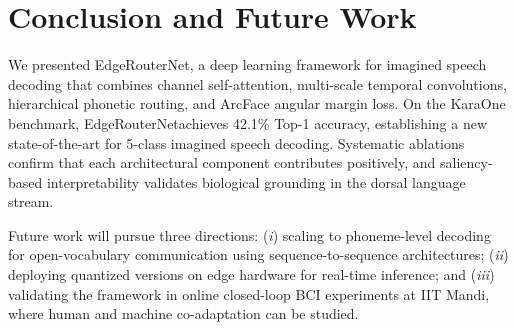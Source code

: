 \documentclass[conference]{IEEEtran}
\newcommand{\method}{EdgeRouterNet}
\begin{document}
\section{Conclusion and Future Work}
We presented \method, a deep learning framework for imagined speech decoding that combines channel self-attention, multi-scale temporal convolutions, hierarchical phonetic routing, and ArcFace angular margin loss. On the KaraOne benchmark, \method achieves 42.1\% Top-1 accuracy, establishing a new state-of-the-art for 5-class imagined speech decoding. Systematic ablations confirm that each architectural component contributes positively, and saliency-based interpretability validates biological grounding in the dorsal language stream.

Future work will pursue three directions: (\textit{i}) scaling to phoneme-level decoding for open-vocabulary communication using sequence-to-sequence architectures; (\textit{ii}) deploying quantized versions on edge hardware for real-time inference; and (\textit{iii}) validating the framework in online closed-loop BCI experiments at IIT Mandi, where human and machine co-adaptation can be studied.



\end{document}
